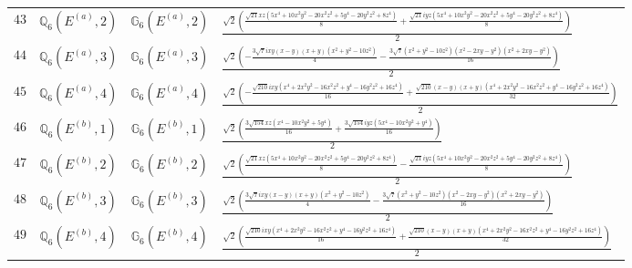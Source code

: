 \documentclass[fleqn,8pt,landscape]{jsarticle}
\begin{document}
\begin{table}[ht!]
\begin{center}
\begin{tabular}{cccl}
$ 43 $ & $ \mathbb{Q}_{6}(E^{(a)},2) $ & $ \mathbb{G}_{6}(E^{(a)},2) $ & $ \frac{\sqrt{2} \left(\frac{\sqrt{21} x z \left(5 x^{4} + 10 x^{2} y^{2} - 20 x^{2} z^{2} + 5 y^{4} - 20 y^{2} z^{2} + 8 z^{4}\right)}{8} + \frac{\sqrt{21} i y z \left(5 x^{4} + 10 x^{2} y^{2} - 20 x^{2} z^{2} + 5 y^{4} - 20 y^{2} z^{2} + 8 z^{4}\right)}{8}\right)}{2} $ \\
$ 44 $ & $ \mathbb{Q}_{6}(E^{(a)},3) $ & $ \mathbb{G}_{6}(E^{(a)},3) $ & $ \frac{\sqrt{2} \left(- \frac{3 \sqrt{7} i x y \left(x - y\right) \left(x + y\right) \left(x^{2} + y^{2} - 10 z^{2}\right)}{4} - \frac{3 \sqrt{7} \left(x^{2} + y^{2} - 10 z^{2}\right) \left(x^{2} - 2 x y - y^{2}\right) \left(x^{2} + 2 x y - y^{2}\right)}{16}\right)}{2} $ \\
$ 45 $ & $ \mathbb{Q}_{6}(E^{(a)},4) $ & $ \mathbb{G}_{6}(E^{(a)},4) $ & $ \frac{\sqrt{2} \left(- \frac{\sqrt{210} i x y \left(x^{4} + 2 x^{2} y^{2} - 16 x^{2} z^{2} + y^{4} - 16 y^{2} z^{2} + 16 z^{4}\right)}{16} + \frac{\sqrt{210} \left(x - y\right) \left(x + y\right) \left(x^{4} + 2 x^{2} y^{2} - 16 x^{2} z^{2} + y^{4} - 16 y^{2} z^{2} + 16 z^{4}\right)}{32}\right)}{2} $ \\
$ 46 $ & $ \mathbb{Q}_{6}(E^{(b)},1) $ & $ \mathbb{G}_{6}(E^{(b)},1) $ & $ \frac{\sqrt{2} \left(\frac{3 \sqrt{154} x z \left(x^{4} - 10 x^{2} y^{2} + 5 y^{4}\right)}{16} + \frac{3 \sqrt{154} i y z \left(5 x^{4} - 10 x^{2} y^{2} + y^{4}\right)}{16}\right)}{2} $ \\
$ 47 $ & $ \mathbb{Q}_{6}(E^{(b)},2) $ & $ \mathbb{G}_{6}(E^{(b)},2) $ & $ \frac{\sqrt{2} \left(\frac{\sqrt{21} x z \left(5 x^{4} + 10 x^{2} y^{2} - 20 x^{2} z^{2} + 5 y^{4} - 20 y^{2} z^{2} + 8 z^{4}\right)}{8} - \frac{\sqrt{21} i y z \left(5 x^{4} + 10 x^{2} y^{2} - 20 x^{2} z^{2} + 5 y^{4} - 20 y^{2} z^{2} + 8 z^{4}\right)}{8}\right)}{2} $ \\
$ 48 $ & $ \mathbb{Q}_{6}(E^{(b)},3) $ & $ \mathbb{G}_{6}(E^{(b)},3) $ & $ \frac{\sqrt{2} \left(\frac{3 \sqrt{7} i x y \left(x - y\right) \left(x + y\right) \left(x^{2} + y^{2} - 10 z^{2}\right)}{4} - \frac{3 \sqrt{7} \left(x^{2} + y^{2} - 10 z^{2}\right) \left(x^{2} - 2 x y - y^{2}\right) \left(x^{2} + 2 x y - y^{2}\right)}{16}\right)}{2} $ \\
$ 49 $ & $ \mathbb{Q}_{6}(E^{(b)},4) $ & $ \mathbb{G}_{6}(E^{(b)},4) $ & $ \frac{\sqrt{2} \left(\frac{\sqrt{210} i x y \left(x^{4} + 2 x^{2} y^{2} - 16 x^{2} z^{2} + y^{4} - 16 y^{2} z^{2} + 16 z^{4}\right)}{16} + \frac{\sqrt{210} \left(x - y\right) \left(x + y\right) \left(x^{4} + 2 x^{2} y^{2} - 16 x^{2} z^{2} + y^{4} - 16 y^{2} z^{2} + 16 z^{4}\right)}{32}\right)}{2} $ \\
 \hline \hline
\end{tabular}
\end{center}
\end{table}
\end{document}
